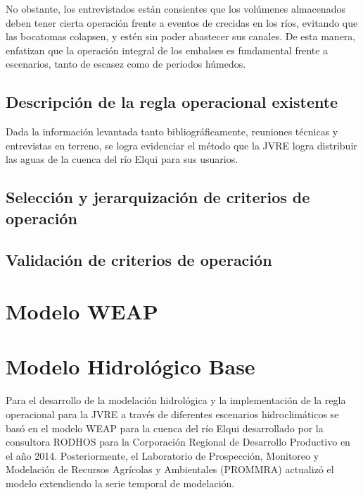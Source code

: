 \documentclass[11pt,]{article}
\begin{document}
 No obstante, los entrevistados están consientes que los volúmenes almacenados deben tener cierta operación frente a eventos de crecidas en los ríos, evitando que las bocatomas colapsen, y estén sin poder abastecer sus canales. De esta manera, enfatizan que la operación integral de los embalses es fundamental frente a escenarios, tanto de escasez como de periodos húmedos.
 
 
 
 
		
		\subsection{Descripción de la regla operacional existente}\bigskip
		
		Dada la información levantada tanto bibliográficamente, reuniones técnicas y entrevistas en terreno, se logra evidenciar el método que la JVRE logra distribuir las aguas de la cuenca del río Elqui para sus usuarios. 
		
			\subsection{Selección y jerarquización de criterios de operación}\bigskip
			
			
			
			\subsection{Validación de criterios de operación}\bigskip

\section{Modelo WEAP}



\section{Modelo Hidrológico Base}\bigskip

Para el desarrollo de la modelación hidrológica y la implementación de la regla operacional para la JVRE a través de diferentes escenarios hidroclimáticos se basó en el modelo WEAP para la cuenca del río Elqui desarrollado por la consultora RODHOS para la Corporación Regional de Desarrollo Productivo en el año 2014. Posteriormente, el Laboratorio de Prospección, Monitoreo y Modelación de Recursos Agrícolas y Ambientales (PROMMRA) actualizó el modelo extendiendo la serie temporal de modelación.\bigskip
\end{document}
